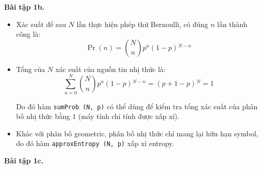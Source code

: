 \documentclass{article}
\begin{document}
\par\textbf{Bài tập 1b.}

\begin{itemize}
    \item Xác suất để sau $N$ lần thực hiện phép thử Bernoulli, có đúng $n$ lần thành công là:
        \[ \Pr(n) = \binom{N}{n}p^{n}(1-p){}^{N-n} \]
    \item Tổng của $N$ xác suất của nguồn tin nhị thức là:
        \[
            \sum^{N}_{n=0}\binom{N}{n}p^{n}(1-p){}^{N-n} = (p + 1- p){}^{N} = 1
        \]
        \par Do đó hàm \texttt{sumProb (N, p)} có thể dùng để kiểm tra tổng xác suất của phân bố nhị thức bằng $1$ (máy tính chỉ tính được xấp xỉ).
    \item Khác với phân bố geometric, phân bố nhị thức chỉ mang lại hữu hạn symbol, do đó hàm \texttt{approxEntropy (N, p)} xấp xỉ entropy.
\end{itemize}

\par\textbf{Bài tập 1c.}
\end{document}
